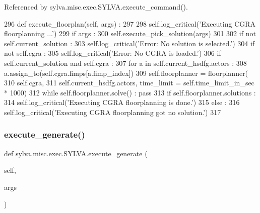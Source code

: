 Referenced by sylva.\+misc.\+exec.\+S\+Y\+L\+V\+A.\+execute\+\_\+command().


\begin{DoxyCode}
296   \textcolor{keyword}{def }execute\_floorplan(self, args) :
297 
298     self.log\_critical(\textcolor{stringliteral}{'Executing CGRA floorplanning ...'})
299     \textcolor{keywordflow}{if} args :
300       self.execute\_pick\_solution(args)
301 
302     \textcolor{keywordflow}{if} \textcolor{keywordflow}{not} self.current\_solution :
303       self.log\_critical(\textcolor{stringliteral}{'Error: No solution is selected.'})
304     \textcolor{keywordflow}{if} \textcolor{keywordflow}{not} self.cgra :
305       self.log\_critical(\textcolor{stringliteral}{'Error: No CGRA is loaded.'})
306     \textcolor{keywordflow}{if} self.current\_solution \textcolor{keywordflow}{and} self.cgra :
307       \textcolor{keywordflow}{for} a \textcolor{keywordflow}{in} self.current\_hsdfg.actors :
308         a.assign\_to(self.cgra.fimps[a.fimp\_index])
309       self.floorplanner = floorplanner(
310         self.cgra,
311         self.current\_hsdfg.actors, time\_limit = self.time\_limit\_in\_sec * 1000)
312       \textcolor{keywordflow}{while} self.floorplanner.solve() : \textcolor{keywordflow}{pass}
313       \textcolor{keywordflow}{if} self.floorplanner.solutions :
314         self.log\_critical(\textcolor{stringliteral}{'Executing CGRA floorplanning is done.'})
315       \textcolor{keywordflow}{else} :
316         self.log\_critical(\textcolor{stringliteral}{'Executing CGRA floorplanning got no solution.'})
317 
\end{DoxyCode}
\mbox{\label{classsylva_1_1misc_1_1exec_1_1_s_y_l_v_a_a11805867dcb2df10927531d78d9c26ca}} 
\subsubsection{\texorpdfstring{execute\+\_\+generate()}{execute\_generate()}}
{\footnotesize\ttfamily def sylva.\+misc.\+exec.\+S\+Y\+L\+V\+A.\+execute\+\_\+generate (\begin{DoxyParamCaption}\item[{}]{self,  }\item[{}]{args }\end{DoxyParamCaption})}



